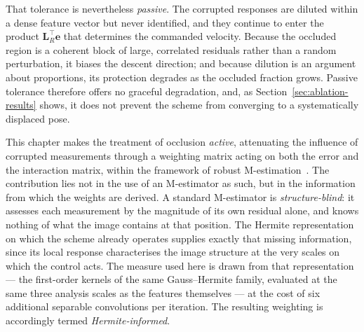 That tolerance is nevertheless \emph{passive}. The corrupted responses are
diluted within a dense feature vector but never identified, and they continue
to enter the product $\mathbf{L}_{R}^{\top}\mathbf{e}$ that determines the
commanded velocity. Because the occluded region is a coherent block of large,
correlated residuals rather than a random perturbation, it biases the descent
direction; and because dilution is an argument about proportions, its
protection degrades as the occluded fraction grows. Passive tolerance
therefore offers no graceful degradation, and, as
Section~\ref{sec:ablation-results} shows, it does not prevent the scheme from
converging to a systematically displaced pose.

This chapter makes the treatment of occlusion \emph{active}, attenuating the
influence of corrupted measurements through a weighting matrix acting on both
the error and the interaction matrix, within the framework of robust
M-estimation~\cite{key26}. The contribution lies not in the use of an
M-estimator as such, but in the information from which the weights are
derived. A standard M-estimator is \emph{structure-blind}: it assesses each
measurement by the magnitude of its own residual alone, and knows nothing of
what the image contains at that position. The Hermite representation on which
the scheme already operates supplies exactly that missing information, since
its local response characterises the image structure at the very scales on
which the control acts. The measure used here is drawn from that
representation --- the first-order kernels of the same Gauss--Hermite family,
evaluated at the same three analysis scales as the features themselves --- at
the cost of six additional separable convolutions per iteration. The resulting
weighting is accordingly termed \emph{Hermite-informed}.

